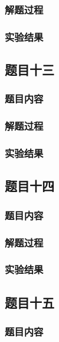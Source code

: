 \documentclass[11pt,a4paper]{ctexart}
\begin{document}
\subsubsection{解题过程}
\mbox{}

\subsubsection{实验结果}
\mbox{}

\subsection{题目十三}
\subsubsection{题目内容}
\mbox{}

\subsubsection{解题过程}
\mbox{}

\subsubsection{实验结果}
\mbox{}

\subsection{题目十四}
\subsubsection{题目内容}
\mbox{}

\subsubsection{解题过程}
\mbox{}

\subsubsection{实验结果}
\mbox{}

\subsection{题目十五}
\subsubsection{题目内容}
\mbox{}
\end{document}
